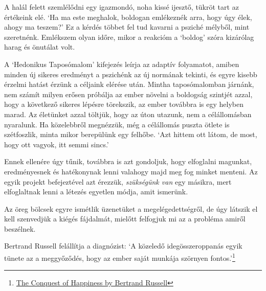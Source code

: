 
\enlargethispage*{\baselineskip}

A halál felett szemlélődni egy igazmondó, noha kissé ijesztő, tükröt
tart az értékeink elé. `Ha ma este meghalok, boldogan emlékeznék arra,
hogy úgy élek, ahogy ma teszem?' Ez a kérdés többet fel tud kavarni a
psziché mélyből, mint szeretnénk. Emlékszem olyan időre, mikor a
reakcióm a `boldog' szóra kizárólag harag és önutálat volt.

A `Hedonikus Taposómalom' kifejezés leírja az adaptív folyamatot, amiben
minden új sikeres eredményt a pszichénk az új normának tekinti, és egyre
kisebb érzelmi hatást érzünk a céljaink elérése után. Mintha
taposómalomban járnánk, nem számít milyen erősen próbálja az ember
növelni a boldogság szintjét azzal, hogy a következő sikeres lépésre
törekszik, az ember továbbra is egy helyben marad. Az életünket azzal
töltjük, hogy az úton utazunk, nem a célállomásban nyaralunk. Ha
közelebbről megnézzük, még a célállomás puszta ötlete is szétfoszlik,
minta mikor berepülünk egy felhőbe. `Azt hittem ott látom, de most, hogy
ott vagyok, itt semmi sincs.'

Ennek ellenére úgy tűnik, továbbra is azt gondoljuk, hogy elfoglalni
magunkat, eredményesnek és hatékonynak lenni valahogy majd meg fog
minket menteni. Az egyik projekt befejeztével azt érezzük,
\emph{szükségünk van} egy másikra, mert elfoglaltnak lenni a létezés
egyetlen módja, amit ismerünk.

Az öreg bölcsek egyre ismétlik üzenetüket a megelégedettségről, de úgy
látszik el kell szenvedjük a kiégés fájdalmát, mielőtt felfogjuk mi az a
probléma amiről beszélnek.

Bertrand Russell felállítja a diagnózist: `A közeledő idegösszeroppanás
egyik tünete az a meggyőződés, hogy az ember saját munkája szörnyen
fontos.'\footnote{\href{https://www.goodreads.com/book/show/51783.The_Conquest_of_Happiness}{The
  Conquest of Happiness by Bertrand Russell}}

\clearpage

